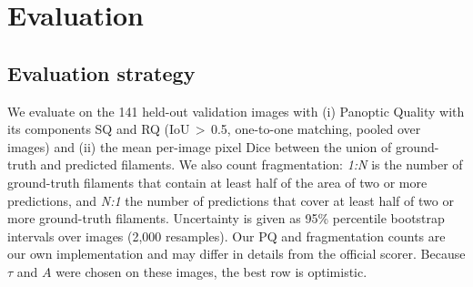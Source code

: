 \documentclass[sigconf]{acmart}
\begin{document}
\section{Evaluation}\label{sec:evaluation}

\subsection{Evaluation strategy}
We evaluate on the 141 held-out validation images with (i) Panoptic Quality with its components SQ and RQ (IoU\,$>$\,0.5, one-to-one matching, pooled over images) and (ii) the mean per-image pixel Dice between the union of ground-truth and predicted filaments. We also count fragmentation: \emph{1:N} is the number of ground-truth filaments that contain at least half of the area of two or more predictions, and \emph{N:1} the number of predictions that cover at least half of two or more ground-truth filaments. Uncertainty is given as 95\% percentile bootstrap intervals over images (2,000 resamples). Our PQ and fragmentation counts are our own implementation and may differ in details from the official scorer. Because $\tau$ and $A$ were chosen on these images, the best row is optimistic.
\end{document}
